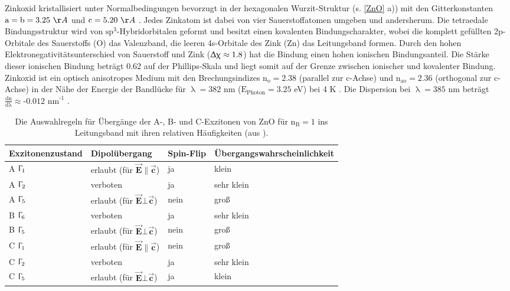 Zinkoxid kristallisiert unter Normalbedingungen bevorzugt in der hexagonalen Wurzit-Struktur (s. \autoref{ZnO} a)) mit den Gitterkonstanten \mbox{$\text{a}= \text{b} = \text{3.25 } \AA$} und $\text{c} = \text{5.20 } \AA$ \cite{Klingshirn.2010}. Jedes Zinkatom ist dabei von vier Sauerstoffatomen \mbox{umgeben} und andersherum. Die tetraedale Bindungsstruktur wird von $\text{sp}^\text{3}$-Hybridorbitalen \mbox{geformt} und besitzt einen kovalenten Bindungscharakter, wobei die komplett \mbox{gefüllten} \mbox{2p-Orbitale} des Sauerstoffs (O) das Valenzband, die leeren 4s-Orbitale des Zink (Zn) das Leitungsband formen. Durch den hohen Elektronegativitätsunterschied  von \mbox{Sauerstoff} und Zink ($\Updelta\upchi\approx \text{1.8}$) hat die Bindung einen hohen ionischen Bindungsanteil. Die Stärke dieser ionischen Bindung beträgt 0.62 auf der Phillips-Skala \cite{Ivanov.1981} und liegt somit auf der Grenze zwischen ionischer und kovalenter Bindung.  Zinkoxid ist ein optisch anisotropes Medium mit den Brechungsindizes $\text{n}_\text{o}= \text{2.38}$ (parallel zur c-Achse) und $\text{n}_\text{ao}= \text{2.36}$ (orthogonal zur c-Achse) in der Nähe der Energie der Bandlücke für $\uplambda= \text{382}$ nm ($\text{E}_\text{Photon}= \text{3.25}$ eV) bei 4 K \cite{Park.1968}. Die Dispersion bei $\uplambda=\text{385 nm}$ beträgt $\frac{\text{dn}}{\text{d} \uplambda} \approx \text{-0.012 nm}^\text{-1}$ \cite{Zimmler.2010}.
\begin{table}[h]
\centering
\begin{footnotesize}
\begin{tabular}{llll}
Exzitonenzustand & Dipolübergang & Spin-Flip & Übergangswahrscheinlichkeit\\
\toprule
A $\Upgamma_\text{1}$ & erlaubt (für $\vec{\textbf{E}} \| \vec{\textbf{c}}$) & ja & klein\\
A $\Upgamma_\text{2}$ & verboten & ja & sehr klein\\
A $\Upgamma_\text{5}$ & erlaubt (für $\vec{\textbf{E}} \bot \vec{\textbf{c}}$) & nein & groß\\
\midrule
B $\Upgamma_\text{6}$ & verboten & ja & sehr klein\\
B $\Upgamma_\text{5}$ & erlaubt (für $\vec{\textbf{E}} \bot \vec{\textbf{c}}$) & nein & groß\\
\midrule
C $\Upgamma_\text{1}$ & erlaubt (für $\vec{\textbf{E}} \| \vec{\textbf{c}}$) & nein & groß\\
C $\Upgamma_\text{2}$ & verboten & ja & sehr klein\\
C $\Upgamma_\text{5}$ & erlaubt (für $\vec{\textbf{E}} \bot \vec{\textbf{c}}$) & ja & klein\\
\end{tabular}
\end{footnotesize}
\caption[Auswahlregeln der Anregung für Exzitonen]{Die Auswahlregeln für Übergänge der A-, B- und C-Exzitonen von ZnO für $\text{n}_\text{B}=\text{1}$ ins Leitungsband mit ihren relativen Häufigkeiten (aus \cite{Klingshirn.2010}).}
\label{spinueb}
\end{table}
